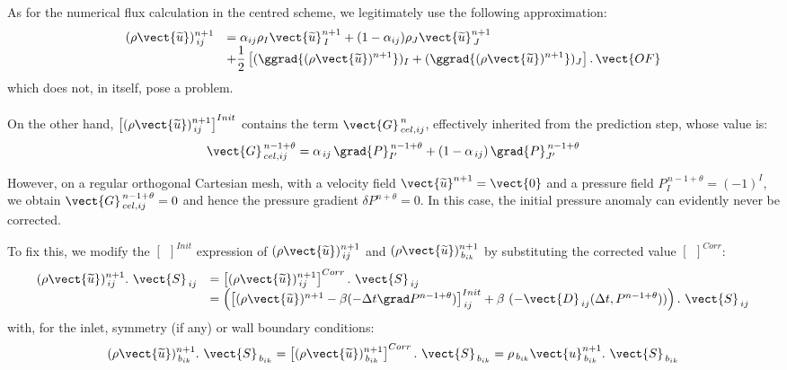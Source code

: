 As for the numerical flux calculation in the centred scheme, we legitimately
use the following approximation:
\begin{equation}
\begin{array}{ll}
(\rho \vect{\widetilde{u}})^{n+1}_{\,ij}&=
\alpha_{ij} \rho_{I} \vect{\widetilde{u}}^{n+1}_{\,I} +
(1-\alpha_{ij}) \rho_{J} \vect{\widetilde{u}}^{n+1}_{\,J}\\
&+\displaystyle \frac{1}{2}\left[(\ggrad{(\rho\vect{\widetilde{u}})^{n+1}})_I
+ (\ggrad{(\rho\vect{\widetilde{u}})^{n+1}})_J\right]\text{.}\, \vect{OF}
\end{array}
\end{equation}
which does not, in itself, pose a problem.\\\\
On the other hand, $ \left[(\rho\vect{\widetilde{u}})^{n+1}_{\,ij}\right]^{Init}$
contains the term $\vect{G}^{\,n}_{\,cel,ij}$, effectively inherited from the prediction step, whose value is:\\
\begin{equation}\notag
\vect{G}^{\,n-1+\theta}_{\,cel,ij}=\alpha_{\,ij}\, \grad{P}^{\,n-1+\theta}_{I'} +
(1-\alpha_{\,ij})\, \grad{P}^{\,n-1+\theta}_{J'}
\end{equation}

However, on a regular orthogonal Cartesian mesh, with a velocity field
$\vect{\widetilde{u}}^{n+1}=\vect{0}$ and a pressure field $P^{\,n-1+\theta}_I=(-1)^{I}$,
we obtain $\vect{G}^{\,n-1+\theta}_{\,cel,ij}=0$ and hence the pressure gradient
$\delta P^{n+\theta}=0$. In this case, the initial pressure anomaly can evidently
never be corrected.

To fix this, we modify the $\left[{\ \ }\right]^{Init}$ expression of $(\rho
\vect{\widetilde{u}})^{n+1}_{\,ij}$ and $(\rho\vect{\widetilde{u}})^{n+1}_{\,{b}_{ik}}$
by substituting the corrected value  $\left[{\ \ }\right]^{Corr}$:
\begin{equation}
\begin{array}{ll}
(\rho \vect{\widetilde{u}})^{n+1}_{\,ij}.\ \vect{S}_{\,ij}&=
\left[(\rho \vect{\widetilde{u}})^{n+1}_{\,ij}\right]^{Corr}.\ \vect{S}_{\,ij}\\
&= \left(\left[(\rho \vect{\widetilde{u}})^{n+1}-\beta(-\Delta t \grad P^{n-1+\theta})\right]^{Init}_{\,ij}
+\beta\ (-\vect{D}_{\,ij}(\Delta t, P^{n-1+\theta}))\right).\ \vect{S}_{\,ij}
\end{array}
\end{equation}
with, for the inlet, symmetry (if any) or wall boundary conditions:
\begin{equation}\notag
(\rho \vect{\widetilde{u}})^{n+1}_{\,{b}_{ik}}.\ \vect{S}_{\,b_{ik}}=\left[(\rho \vect{\widetilde{u}})^{n+1}_{\,{b}_{ik}}\right]^{Corr}.\ \vect{S}_{\,b_{ik}}=
\rho _{\,{b}_{ik}}\vect{u}^{n+1}_{\,{b}_{ik}}.\ \vect{S}_{\,b_{ik}}
\end{equation}

